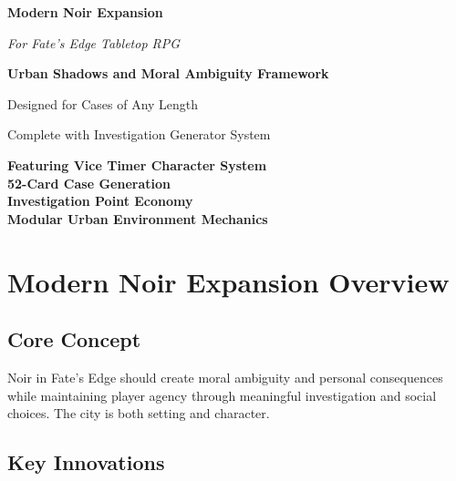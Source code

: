\documentclass[11pt]{article}
\begin{document}


\begin{titlepage}
\centering
\vspace*{2cm}

{\Huge\bfseries\color{headercolor} Modern Noir Expansion} 

\vspace{0.5cm}

{\Large\itshape For Fate's Edge Tabletop RPG}

\vspace{2cm}

\vspace{2cm}

{\Large\bfseries Urban Shadows and Moral Ambiguity Framework}

\vspace{1cm}

{\large Designed for Cases of Any Length}

\vspace{1cm}

{\large Complete with Investigation Generator System}

\vfill

{\large 
\textbf{Featuring Vice Timer Character System} \\
\textbf{52-Card Case Generation} \\
\textbf{Investigation Point Economy} \\
\textbf{Modular Urban Environment Mechanics}
}

\end{titlepage}

\newpage

\tableofcontents

\newpage

\section{Modern Noir Expansion Overview}

\subsection{Core Concept}

Noir in Fate's Edge should create moral ambiguity and personal consequences while maintaining player agency through meaningful investigation and social choices. The city is both setting and character.

\subsection{Key Innovations}
\end{document}
